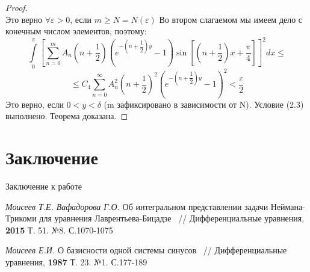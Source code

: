 \documentclass[a4paper, 12pt]{article}
\numberwithin{equation}{section}
\numberwithin{lemma}{section}
\numberwithin{definition}{section}
\numberwithin{notabene}{section}
\numberwithin{corollary}{section}
\begin{document}
\begin{proof}
\begin{equation*}
\end{equation*}
Это верно $\forall \varepsilon > 0$, если $m \geq N =N(\varepsilon)$\newline
Во втором слагаемом мы имеем дело с конечным числом элементов, поэтому:
\begin{equation*}
	\int\limits_0^\pi \left[	\sum\limits_{n=0}^{m} A_n\left(n+\dfrac12\right) \left( e^{-\left(n+\dfrac12\right)y} - 1\right) \sin{\left[\left(n+\dfrac12\right) x  + \dfrac\pi4\right]} \right]^2 dx \leq
\end{equation*}
\begin{equation*}
\leq C_4 \sum\limits_{n=0}^{\infty} A_n^2 \left(n +\dfrac12\right)^2 \left(e^{-\left(n+\dfrac12\right)y} - 1\right)^2 < \dfrac{\varepsilon}{2}
\end{equation*}
Это верно, если $0 < y < \delta$ (m зафиксировано в зависимости от N). Условие (2.3) выполнено. Теорема доказана.
\end{proof}

\section{Заключение}

Заключение к работе

\newpage
{}
\vspace{-2.3cm}
\renewcommand{\refname}{\begin{center}
{\normalsize \rm СПИСОК ЛИТЕРАТУРЫ} \end{center}}

\begin{thebibliography}{99} \itemsep=-2pt \vspace{-0.8cm}


         \textit{Моисеев Т.Е.} \textit{Вафадорова Г.О.} Об интегральном представлении задачи Неймана-Трикоми для уравнения Лаврентьева-Бицадзе ~// Дифференциальные уравнения, \textbf{2015} Т. 51. №8. С.1070-1075

        \textit{Моисеев Е.И.} О базисности одной системы синусов ~// Дифференциальные уравнения, \textbf{1987} Т. 23. №1. С.177-189

\end{thebibliography}
\end{document}
